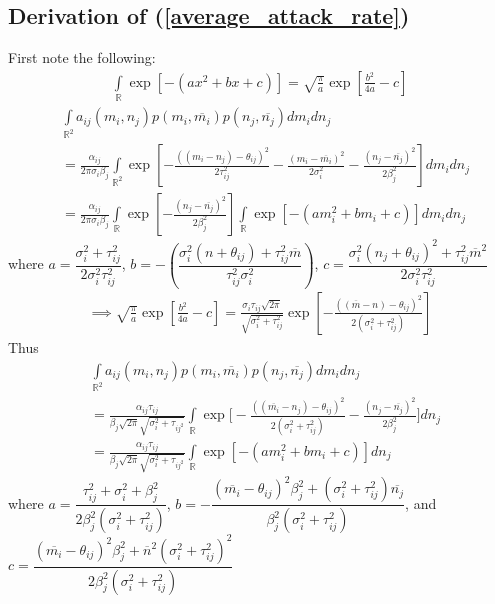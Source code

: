 \documentclass{amsart}
\theoremstyle{definition}
\theoremstyle{remark}
\numberwithin{equation}{section}
\begin{document}
\subsection*{Derivation of (\ref{average_attack_rate})}
First note the following:
\begin{align*}
	\int\limits_{\mathbb{R}}\exp\left[-(ax^2 + bx + c)\right] = \sqrt{\frac{\pi}{a}}\exp\left[\frac{b^2}{4a} - c\right]
\end{align*}
\begin{align*}
	&\int\limits_{\mathbb{R}^2}a_{ij}(m_i, n_j)p(m_i, \overline{m_i})p(n_j, \overline{n_j})dm_idn_j \\
	&= \frac{\alpha_{ij}}{2\pi\sigma_i\beta_j}\int\limits_{\mathbb{R}^2}\exp\left[-\frac{((m_i - n_j) - \theta_{ij})^2}{2\tau_{ij}^2} - \frac{(m_i - \overline{m_i})^2}{2\sigma_i^2} - \frac{(n_j - \overline{n_j})^2}{2\beta_j^2}\right]dm_idn_j \\
	&= \frac{\alpha_{ij}}{2\pi\sigma_i\beta_j}\int\limits_{\mathbb{R}}\exp\left[-\frac{(n_j - \overline{n_j})^2}{2\beta_j^2}\right]\int\limits_{\mathbb{R}}\exp\left[-(am_i^2 + bm_i + c)\right]dm_idn_j
\end{align*}
where $a = \dfrac{\sigma_i^2 + \tau_{ij}^2}{2\sigma_i^2\tau_{ij}^2}$, $b = -\left(\dfrac{\sigma_i^2(n + \theta_{ij}) + \tau_{ij}^2\overline{m}}{\tau_{ij}^2\sigma_i^2}\right)$, $c = \dfrac{\sigma_i^2(n_j + \theta_{ij})^2 + \tau_{ij}^2\overline{m}^2}{2\sigma_i^2\tau_{ij}^2}$
\begin{align*}
	\implies \sqrt{\frac{\pi}{a}}\exp\left[\frac{b^2}{4a} - c\right] = \frac{\sigma_i\tau_{ij}\sqrt{2\pi}}{\sqrt{\sigma_i^2 + \tau_{ij}^2}}\exp\left[-\frac{((\overline{m} - n) - \theta_{ij})^2}{2(\sigma_i^2 + \tau_{ij}^2)}\right]
\end{align*}
Thus
\begin{align*}
	&\int\limits_{\mathbb{R}^2}a_{ij}(m_i, n_j)p(m_i, \overline{m_i})p(n_j, \overline{n_j})dm_idn_j \\
	&= \frac{\alpha_{ij}\tau_{ij}}{\beta_j\sqrt{2\pi}\sqrt{\sigma_i^2 + \tau_{ij^2}}}\int\limits_{\mathbb{R}}\exp\Bigg[-\frac{((\overline{m_i} - n_j) - \theta_{ij})^2}{2(\sigma_i^2 + \tau_{ij}^2)} - \frac{(n_j - \overline{n_j})^2}{2\beta_j^2}\Bigg]dn_j \\
	&= \frac{\alpha_{ij}\tau_{ij}}{\beta_j\sqrt{2\pi}\sqrt{\sigma_i^2 + \tau_{ij^2}}}\int\limits_{\mathbb{R}}\exp\left[-(am_i^2 + bm_i + c)\right]dn_j
\end{align*}
where $a = \dfrac{\tau_{ij}^2 + \sigma_i^2 + \beta_j^2}{2\beta_j^2(\sigma_i^2 + \tau_{ij}^2)}$, $b = -\dfrac{(\overline{m_i} - \theta_{ij})^2\beta_j^2 + (\sigma_i^2 + \tau_{ij}^2)\overline{n_j}}{\beta_j^2(\sigma_i^2 + \tau_{ij}^2)}$, and $c = \dfrac{(\overline{m_i} - \theta_{ij})^2\beta_j^2 + \overline{n}^2(\sigma_i^2 + \tau_{ij}^2)^2}{2\beta_j^2(\sigma_i^2 + \tau_{ij}^2)}$
\end{document}
